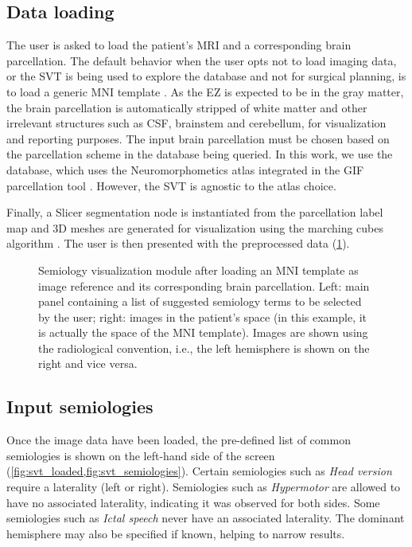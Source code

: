 \subsection{Data loading}
\label{sec:svt_loading}

The user is asked to load the patient's \ac{MRI} and a corresponding brain parcellation.
The default behavior when the user opts not to load imaging data, or the \ac{SVT} is being used to explore the database and not for surgical planning, is to load a generic \ac{MNI} template \cite{fonov_unbiased_2009}.
As the \ac{EZ} is expected to be in the gray matter, the brain parcellation is automatically stripped of white matter and other irrelevant structures such as \ac{CSF}, brainstem and cerebellum, for visualization and reporting purposes.
The input brain parcellation must be chosen based on the parcellation scheme in the database being queried.
In this work, we use the \svtdatabase database, which uses the Neuromorphometics atlas integrated in the \ac{GIF} parcellation tool \cite{cardoso_geodesic_2015}.
However, the \ac{SVT} is agnostic to the atlas choice.

Finally, a Slicer segmentation node is instantiated from the parcellation label map and 3D meshes are generated for visualization using the marching cubes algorithm \cite{lorensen_marching_1987,pinter_polymorph_2019}.
The user is then presented with the preprocessed data (\cref{fig:svt_loaded}).

\begin{figure}
  \centering
  \caption[SVT after loading a template and its parcellation]{
    Semiology visualization module after loading an \acf{MNI} template as image reference and its corresponding brain parcellation.
    Left: main panel containing a list of suggested semiology terms to be selected by the user;
    right: images in the patient's space (in this example, it is actually the space of the \ac{MNI} template).
    Images are shown using the radiological convention, i.e., the left hemisphere is shown on the right and vice versa.
  }
  \label{fig:svt_loaded}
\end{figure}


\subsection{Input semiologies}
\label{sec:svt_semiologies}

Once the image data have been loaded, the pre-defined list of common semiologies is shown on the left-hand side of the screen (\cref{fig:svt_loaded,fig:svt_semiologies}).
Certain semiologies such as \textit{Head version} require a laterality (left or right).
Semiologies such as \textit{Hypermotor} are allowed to have no associated laterality, indicating it was observed for both sides.
Some semiologies such as \textit{Ictal speech} never have an associated laterality.
The dominant hemisphere may also be specified if known, helping to narrow results.


